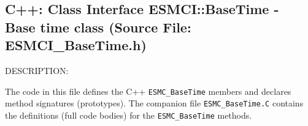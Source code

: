  
\setlength{\oldparskip}{\parskip}
\setlength{\parskip}{1.5ex}
\setlength{\oldparindent}{\parindent}
\setlength{\parindent}{0pt}
\setlength{\oldbaselineskip}{\baselineskip}
\setlength{\baselineskip}{11pt}
 
\def\bv{\begin{verbatim}}
\def\ev{\end{verbatim}}
\def\be{\begin{equation}}
\def\ee{\end{equation}}
\def\bea{\begin{eqnarray}}
\def\eea{\end{eqnarray}}
\def\bi{\begin{itemize}}
\def\ei{\end{itemize}}
\def\bn{\begin{enumerate}}
\def\en{\end{enumerate}}
\def\bd{\begin{description}}
\def\ed{\end{description}}
\def\({\left (}
\def\){\right )}
\def\[{\left [}
\def\]{\right ]}
\def\<{\left  \langle}
\def\>{\right \rangle}
\def\cI{{\cal I}}
\def\diag{\mathop{\rm diag}}
\def\tr{\mathop{\rm tr}}


 
\subsection{C++:  Class Interface ESMCI::BaseTime - Base time class (Source File: ESMCI\_BaseTime.h)}


  
{\sf DESCRIPTION:\\ }


  
   The code in this file defines the C++ {\tt ESMC\_BaseTime} members and
   declares method signatures (prototypes).  The companion file
   {\tt ESMC\_BaseTime.C} contains the definitions (full code bodies) for
   the {\tt ESMC\_BaseTime} methods.
  
